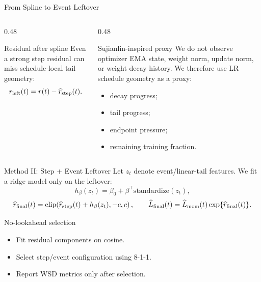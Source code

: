 \documentclass[fontset=fandol,aspectratio=169,10pt]{ctexbeamer}
\begin{document}
\begin{frame}{From Spline to Event Leftover}
  \begin{columns}[T,onlytextwidth]
    \begin{column}{0.48\textwidth}
      \begin{block}{Residual after spline}
        Even a strong step residual can miss schedule-local tail geometry:
        \[
          r_{\rm left}(t)
          =
          r(t)-\widehat r_{\rm step}(t).
        \]
      \end{block}
    \end{column}
    \begin{column}{0.48\textwidth}
      \begin{block}{Sujianlin-inspired proxy}
        We do not observe optimizer EMA state, weight norm, update norm, or weight decay history. We therefore use LR schedule geometry as a proxy:
        \begin{itemize}
          \item decay progress;
          \item tail progress;
          \item endpoint pressure;
          \item remaining training fraction.
        \end{itemize}
      \end{block}
    \end{column}
  \end{columns}
\end{frame}

\begin{frame}{Method II: Step + Event Leftover}
  Let \(z_t\) denote event/linear-tail features. We fit a ridge model only on the leftover:
  \[
    h_\beta(z_t)=\beta_0+\beta^\top \mathrm{standardize}(z_t),
  \]
  \[
    \widehat r_{\rm final}(t)
    =
    \mathrm{clip}\!\left(
      \widehat r_{\rm step}(t)+h_\beta(z_t),-c,c
    \right),
    \qquad
    \widehat L_{\rm final}(t)=\widehat L_{\rm mom}(t)\exp\{\widehat r_{\rm final}(t)\}.
  \]

  \begin{block}{No-lookahead selection}
    \begin{itemize}
      \item Fit residual components on cosine.
      \item Select step/event configuration using 8-1-1.
      \item Report WSD metrics only after selection.
    \end{itemize}
  \end{block}
\end{frame}
\end{document}
